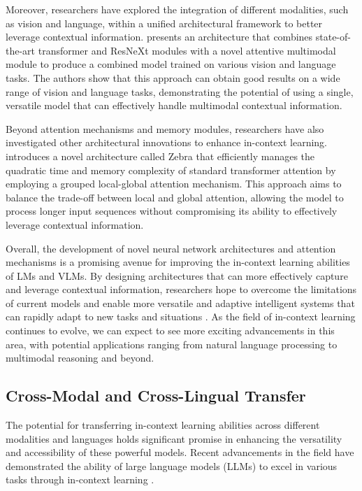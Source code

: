 \documentclass[11pt]{article}
\begin{document}
Moreover, researchers have explored the integration of different modalities, such as vision and language, within a unified architectural framework to better leverage contextual information. \cite{ref367} presents an architecture that combines state-of-the-art transformer and ResNeXt modules with a novel attentive multimodal module to produce a combined model trained on various vision and language tasks. The authors show that this approach can obtain good results on a wide range of vision and language tasks, demonstrating the potential of using a single, versatile model that can effectively handle multimodal contextual information.

Beyond attention mechanisms and memory modules, researchers have also investigated other architectural innovations to enhance in-context learning. \cite{ref368} introduces a novel architecture called Zebra that efficiently manages the quadratic time and memory complexity of standard transformer attention by employing a grouped local-global attention mechanism. This approach aims to balance the trade-off between local and global attention, allowing the model to process longer input sequences without compromising its ability to effectively leverage contextual information.

Overall, the development of novel neural network architectures and attention mechanisms is a promising avenue for improving the in-context learning abilities of LMs and VLMs. By designing architectures that can more effectively capture and leverage contextual information, researchers hope to overcome the limitations of current models and enable more versatile and adaptive intelligent systems that can rapidly adapt to new tasks and situations \cite{ref369,ref370,ref371}. As the field of in-context learning continues to evolve, we can expect to see more exciting advancements in this area, with potential applications ranging from natural language processing to multimodal reasoning and beyond.

\subsection{Cross-Modal and Cross-Lingual Transfer}

The potential for transferring in-context learning abilities across different modalities and languages holds significant promise in enhancing the versatility and accessibility of these powerful models. Recent advancements in the field have demonstrated the ability of large language models (LLMs) to excel in various tasks through in-context learning \cite{ref372,ref121}.
\end{document}
